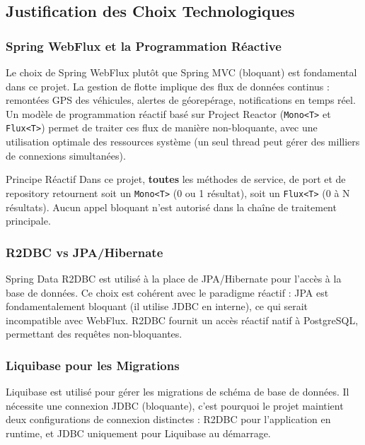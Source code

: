\documentclass[12pt,a4paper]{report}
\begin{document}
\subsection{Justification des Choix Technologiques}

\subsubsection{Spring WebFlux et la Programmation Réactive}

Le choix de Spring WebFlux plutôt que Spring MVC (bloquant) est fondamental dans ce projet. La gestion de flotte implique des flux de données continus : remontées GPS des véhicules, alertes de géorepérage, notifications en temps réel. Un modèle de programmation réactif basé sur Project Reactor (\texttt{Mono<T>} et \texttt{Flux<T>}) permet de traiter ces flux de manière non-bloquante, avec une utilisation optimale des ressources système (un seul thread peut gérer des milliers de connexions simultanées).

\begin{definitionbox}{Principe Réactif}
Dans ce projet, \textbf{toutes} les méthodes de service, de port et de repository retournent soit un \texttt{Mono<T>} (0 ou 1 résultat), soit un \texttt{Flux<T>} (0 à N résultats). Aucun appel bloquant n'est autorisé dans la chaîne de traitement principale.
\end{definitionbox}

\subsubsection{R2DBC vs JPA/Hibernate}

Spring Data R2DBC est utilisé à la place de JPA/Hibernate pour l'accès à la base de données. Ce choix est cohérent avec le paradigme réactif : JPA est fondamentalement bloquant (il utilise JDBC en interne), ce qui serait incompatible avec WebFlux. R2DBC fournit un accès réactif natif à PostgreSQL, permettant des requêtes non-bloquantes.

\subsubsection{Liquibase pour les Migrations}

Liquibase est utilisé pour gérer les migrations de schéma de base de données. Il nécessite une connexion JDBC (bloquante), c'est pourquoi le projet maintient deux configurations de connexion distinctes : R2DBC pour l'application en runtime, et JDBC uniquement pour Liquibase au démarrage.
\end{document}
